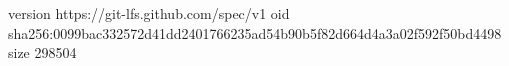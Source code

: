 version https://git-lfs.github.com/spec/v1
oid sha256:0099bac332572d41dd2401766235ad54b90b5f82d664d4a3a02f592f50bd4498
size 298504
